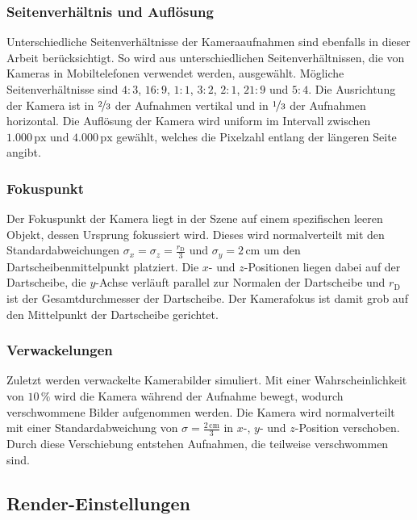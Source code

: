 \subsubsection{Seitenverhältnis und Auflösung}
\label{sec:aufloesung}

Unterschiedliche Seitenverhältnisse der Kameraaufnahmen sind ebenfalls in dieser Arbeit berücksichtigt. So wird aus unterschiedlichen Seitenverhältnissen, die von Kameras in Mobiltelefonen verwendet werden, ausgewählt. Mögliche Seitenverhältnisse sind $4\!:\!3$, $16\!:\!9$, $1\!:\!1$, $3\!:\!2$, $2\!:\!1$, $21\!:\!9$ und $5\!:\!4$. Die Ausrichtung der Kamera ist in $\nicefrac{2}{3}$ der Aufnahmen vertikal und in $\nicefrac{1}{3}$ der Aufnahmen horizontal. Die Auflösung der Kamera wird uniform im Intervall zwischen $1.000\,\text{px}$ und  $4.000\,\text{px}$ gewählt, welches die Pixelzahl entlang der längeren Seite angibt.

\subsubsection{Fokuspunkt}
\label{sec:fokus}

Der Fokuspunkt der Kamera liegt in der Szene auf einem spezifischen leeren Objekt, dessen Ursprung fokussiert wird. Dieses wird normalverteilt mit den Standardabweichungen $\sigma_x = \sigma_z = \frac{r_\text{D}}{3}$ und $\sigma_y = 2\,\text{cm}$ um den Dartscheibenmittelpunkt platziert. Die $x$- und $z$-Positionen liegen dabei auf der Dartscheibe, die $y$-Achse verläuft parallel zur Normalen der Dartscheibe und $r_\text{D}$ ist der Gesamtdurchmesser der Dartscheibe. Der Kamerafokus ist damit grob auf den Mittelpunkt der Dartscheibe gerichtet.

\subsubsection{Verwackelungen}
\label{sec:motion_blur}

Zuletzt werden verwackelte Kamerabilder simuliert. Mit einer Wahrscheinlichkeit von $10\,\%$ wird die Kamera während der Aufnahme bewegt, wodurch verschwommene Bilder aufgenommen werden. Die Kamera wird normalverteilt mit einer Standardabweichung von $\sigma = \frac{2\,\text{cm}}{3}$ in $x$-, $y$- und $z$-Position verschoben. Durch diese Verschiebung entstehen Aufnahmen, die teilweise verschwommen sind.

\subsection{Render-Einstellungen}  %
\label{sec:render_einstellungen}


